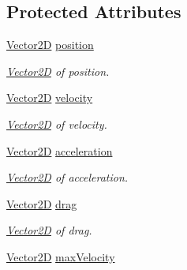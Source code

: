 \subsection*{Protected Attributes}
\begin{DoxyCompactItemize}
\item 
\hypertarget{class_movable_aabc3da1506fc73517ed6b41de02b8192}{\hyperlink{class_vector2_d}{Vector2\-D} \hyperlink{class_movable_aabc3da1506fc73517ed6b41de02b8192}{position}}\label{class_movable_aabc3da1506fc73517ed6b41de02b8192}

\begin{DoxyCompactList}\small\item\em \hyperlink{class_vector2_d}{Vector2\-D} of position. \end{DoxyCompactList}\item 
\hypertarget{class_movable_afc13818f829b2b2fd6319f3c2b8ad2df}{\hyperlink{class_vector2_d}{Vector2\-D} \hyperlink{class_movable_afc13818f829b2b2fd6319f3c2b8ad2df}{velocity}}\label{class_movable_afc13818f829b2b2fd6319f3c2b8ad2df}

\begin{DoxyCompactList}\small\item\em \hyperlink{class_vector2_d}{Vector2\-D} of velocity. \end{DoxyCompactList}\item 
\hypertarget{class_movable_a1e5dd5fb67401d0692cfcba4d1dc371d}{\hyperlink{class_vector2_d}{Vector2\-D} \hyperlink{class_movable_a1e5dd5fb67401d0692cfcba4d1dc371d}{acceleration}}\label{class_movable_a1e5dd5fb67401d0692cfcba4d1dc371d}

\begin{DoxyCompactList}\small\item\em \hyperlink{class_vector2_d}{Vector2\-D} of acceleration. \end{DoxyCompactList}\item 
\hypertarget{class_movable_a4391fef1d549bb6f91bf8943bc11d395}{\hyperlink{class_vector2_d}{Vector2\-D} \hyperlink{class_movable_a4391fef1d549bb6f91bf8943bc11d395}{drag}}\label{class_movable_a4391fef1d549bb6f91bf8943bc11d395}

\begin{DoxyCompactList}\small\item\em \hyperlink{class_vector2_d}{Vector2\-D} of drag. \end{DoxyCompactList}\item 
\hypertarget{class_movable_affaa847aef26cd4268ecf12bf28e2950}{\hyperlink{class_vector2_d}{Vector2\-D} \hyperlink{class_movable_affaa847aef26cd4268ecf12bf28e2950}{max\-Velocity}}\label{class_movable_affaa847aef26cd4268ecf12bf28e2950}


\end{DoxyCompactItemize}
